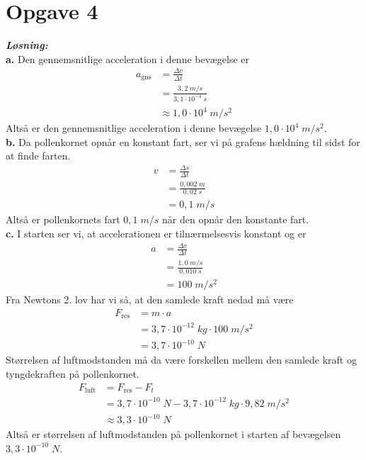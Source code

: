 \documentclass{report}
\newcommand{\sol}{\setlength{\parindent}{0cm}\textbf{\textit{Løsning:}}\setlength{\parindent}{1cm}}
\begin{document}
\section*{Opgave 4}
\sol \\
\textbf{a.}
Den gennemsnitlige acceleration i denne bevægelse er
\begin{equation*}
\begin{split}
  a_{\text{gns} }&= \frac{\Delta v}{\Delta t}\\ 
  &=\frac{3,2 \;\unit{m/s} }{3,1 \cdot 10^{-4} \;\unit{s} }\\ 
  &\approx 1,0 \cdot 10^{4} \;\unit{m/s^2} 
\end{split}
\end{equation*}
Altså er den gennemsnitlige acceleration i denne bevægelse $1,0 \cdot 10^{4} \;\unit{m/s^2} $.\\[1ex]
\textbf{b.}
Da pollenkornet opnår en konstant fart, ser vi på grafens hældning til sidst for at finde farten.
\begin{equation*}
\begin{split}
  v&=\frac{\Delta s}{\Delta t}\\ 
  &=\frac{0,002 \;\unit{m} }{0,02 \;\unit{s} }\\ 
  &=0,1 \;\unit{m/s} 
\end{split}
\end{equation*}
Altså er pollenkornets fart $0,1 \;\unit{m/s} $ når den opnår den konstante fart.\\[1ex]
\textbf{c.}
I starten ser vi, at accelerationen er tilnærmelsesvis konstant og er
\begin{equation*}
\begin{split}
  a&=\frac{\Delta v}{\Delta t}\\ 
  &=\frac{1,0 \;\unit{m/s} }{0,010 \;\unit{s} }\\ 
  &=100 \;\unit{m/s^2} 
\end{split}
\end{equation*}
Fra Newtons 2. lov har vi så, at den samlede kraft nedad må være 
\begin{equation*}
\begin{split}
  F_{\text{res} }&= m \cdot a\\ 
  &= 3,7 \cdot 10^{-12} \;\unit{kg} \cdot 100 \;\unit{m/s^2} \\ 
  &=3,7 \cdot 10^{-10} \;\unit{N} 
\end{split}
\end{equation*}
Størrelsen af luftmodstanden må da være forskellen mellem den samlede kraft og tyngdekraften på pollenkornet.
\begin{equation*}
\begin{split}
  F_{\text{luft} }&= F_{\text{res}} -F_t\\ 
  &=3,7 \cdot 10^{-10} \;\unit{N} -  3,7 \cdot 10^{-12} \;\unit{kg} \cdot 9,82 \;\unit{m/s^2} \\ 
  &\approx 3,3 \cdot 10^{-10} \;\unit{N} 
\end{split}
\end{equation*}
Altså er størrelsen af luftmodstanden på pollenkornet i starten af bevægelsen $3,3 \cdot 10^{-10} \;\unit{N} $.
\end{document}
